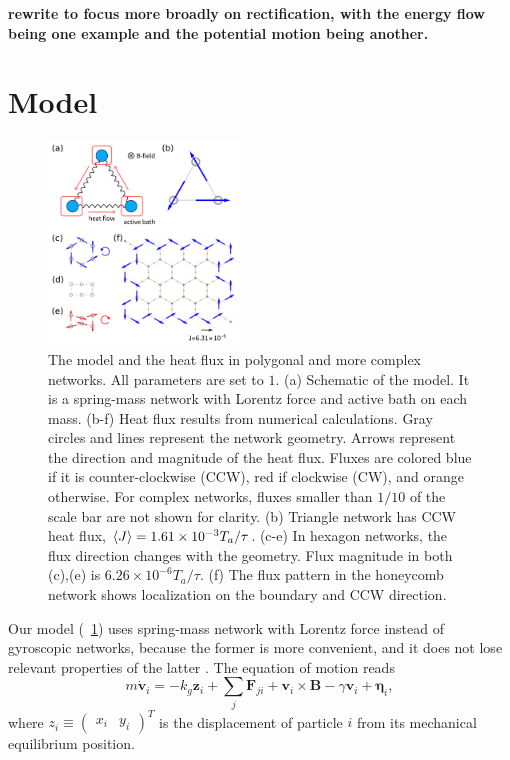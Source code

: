 \documentclass[
 preprint,
 preprintnumbers,
 amsmath,amssymb,
 aps,
 pre,
 longbibliography,
 10pt, twocolumn
]{revtex4-1}
\begin{document}
{\bf rewrite to focus more broadly on rectification, with the energy flow being one example and the potential motion being another. }


\section{Model} \label{sec:model}

\begin{figure}[ht]
	\centering
	\includegraphics[width=0.45\textwidth]{1_model_and_result.pdf}
    \caption{The model and the heat flux in polygonal and more complex networks. All parameters are set to $1$. 
    (a) Schematic of the model. It is a spring-mass network with Lorentz force and active bath on each mass. 
    (b-f) Heat flux results from numerical calculations. Gray circles and lines represent the network geometry. Arrows represent the direction and magnitude of the heat flux. Fluxes are colored blue if it is counter-clockwise (CCW), red if clockwise (CW), and orange otherwise. For complex networks, fluxes smaller than $1/10$ of the scale bar are not shown for clarity. 
    (b) Triangle network has CCW heat flux, $\expval{J}=1.61\times 10^{-3} T_a/\tau$.  
    (c-e) In hexagon networks, the flux direction changes with the geometry. Flux magnitude in both (c),(e) is $6.26\times 10^{-6} T_a/\tau$. 
    (f) The flux pattern in the honeycomb network shows localization on the boundary and CCW direction.
    }
    \label{fig:model_and_result}
\end{figure}

Our model (\figurename~\ref{fig:model_and_result}) uses spring-mass network with Lorentz force instead of gyroscopic networks, because the former is more convenient, and it does not lose relevant properties of the latter \cite{Lee2018TopologicalLaws}.
The equation of motion reads
\begin{equation} \label{eqn:GLE_single}
m\dot{\bm{v}}_i = -k_g \bm{z}_i + \sum_j\bm{F}_{ji} + \bm{v}_i\times\bm{B} - \gamma\bm{v}_i + \bm{\eta}_i ,
\end{equation}
where $z_i \equiv \begin{pmatrix} x_i & y_i \end{pmatrix}^T$ is the displacement of particle $i$ from its mechanical equilibrium position.
\end{document}
